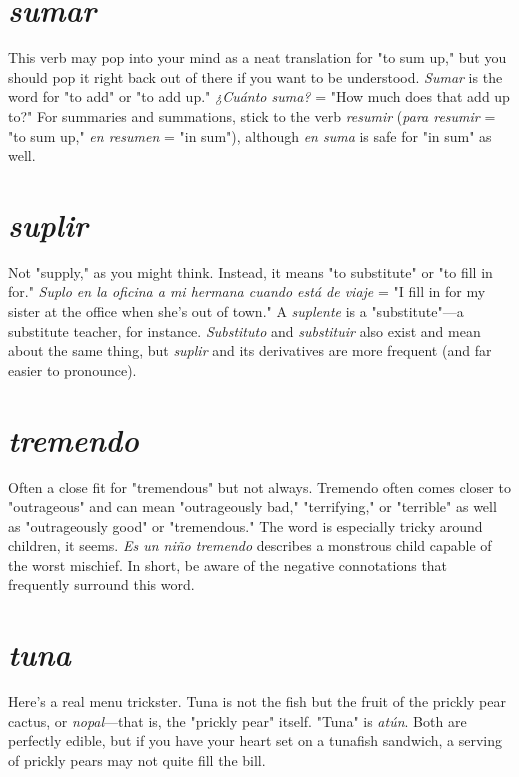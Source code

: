 \documentclass[14pt,a4paper,oneside]{memoir}
\begin{document}
\section{\emph{sumar}}

This verb may pop into your mind as a neat translation for "to sum up," but you should pop it right back out of there if
you want to be understood. \emph{Sumar} is the word for "to add" or "to add
up." \emph{¿Cuánto suma?} = "How much does that add up to?" For summaries and summations, stick to the verb \emph{resumir} (\emph{para resumir} = "to
sum up," \emph{en resumen} = "in sum"), although \emph{en suma} is safe for "in sum" as well.

\section{\emph{suplir}}

Not "supply," as you might think. Instead, it means
"to substitute" or "to fill in for." \emph{Suplo en la oficina a mi hermana
	cuando está de viaje} = "I fill in for my sister at the office when she's
out of town." A \emph{suplente} is a "substitute"---a substitute teacher, for
instance. \emph{Substituto} and \emph{substituir} also exist and mean about the
same thing, but \emph{suplir} and its derivatives are more frequent (and far
easier to pronounce).

\section{\emph{tremendo}}

Often a close fit for "tremendous" but not always. Tremendo often comes closer to "outrageous" and can mean
"outrageously bad," "terrifying," or "terrible" as well as "outrageously
good" or "tremendous." The word is especially tricky around children,
it seems. \emph{Es un niño tremendo} describes a monstrous child capable of
the worst mischief. In short, be aware of the negative connotations
that frequently surround this word.

\section{\emph{tuna}}

Here's a real menu trickster. Tuna is not the fish but
the fruit of the prickly pear cactus, or \emph{nopal}---that is, the "prickly
pear" itself. "Tuna" is \emph{atún}. Both are perfectly edible, but if you have
your heart set on a tunafish sandwich, a serving of prickly pears may
not quite fill the bill.
\end{document}
